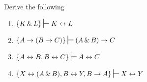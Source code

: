 \noindent\problempart Derive the following 
\begin{enumerate}[label=(\arabic*)]

\item $\{K\eand L\} \sststile{}{} K\eiff L$

%

\item $\{A\eif (B\eif C)\} \sststile{}{} (A\eand B)\eif C$
%

\item $\{A\eiff B, B\eiff C\} \sststile{}{} A\eiff C$
%


\item $\{X \eiff (A \eand B), B \eiff Y, B \eif A\} \sststile{}{} X \eiff Y$

%


\end{enumerate}
